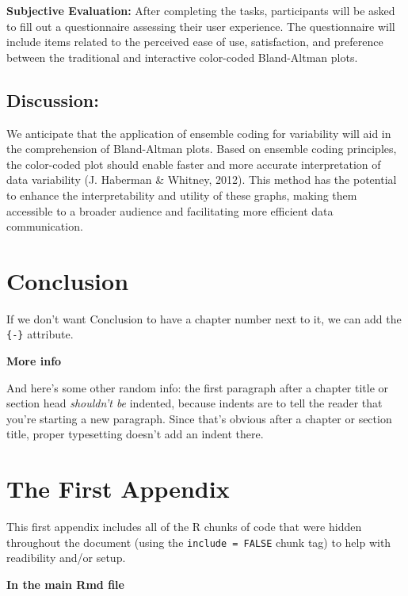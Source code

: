 \documentclass[print]{nuthesis}
\begin{document}
\textbf{Subjective Evaluation:} After completing the tasks, participants will be asked to fill out a questionnaire assessing their user experience.
The questionnaire will include items related to the perceived ease of use, satisfaction, and preference between the traditional and interactive color-coded Bland-Altman plots.

\hypertarget{discussion-1}{%
\section{Discussion:}\label{discussion-1}}

We anticipate that the application of ensemble coding for variability will aid in the comprehension of Bland-Altman plots.
Based on ensemble coding principles, the color-coded plot should enable faster and more accurate interpretation of data variability (J. Haberman \& Whitney, 2012).
This method has the potential to enhance the interpretability and utility of these graphs, making them accessible to a broader audience and facilitating more efficient data communication.

\hypertarget{conclusion-1}{%
\chapter*{Conclusion}\label{conclusion-1}}

If we don't want Conclusion to have a chapter number next to it, we can add the \texttt{\{-\}} attribute.

\textbf{More info}

And here's some other random info: the first paragraph after a chapter title or section head \emph{shouldn't be} indented, because indents are to tell the reader that you're starting a new paragraph. Since that's obvious after a chapter or section title, proper typesetting doesn't add an indent there.

\appendix

\hypertarget{the-first-appendix}{%
\chapter{The First Appendix}\label{the-first-appendix}}

This first appendix includes all of the R chunks of code that were hidden throughout the document (using the \texttt{include\ =\ FALSE} chunk tag) to help with readibility and/or setup.

\textbf{In the main Rmd file}
\end{document}
